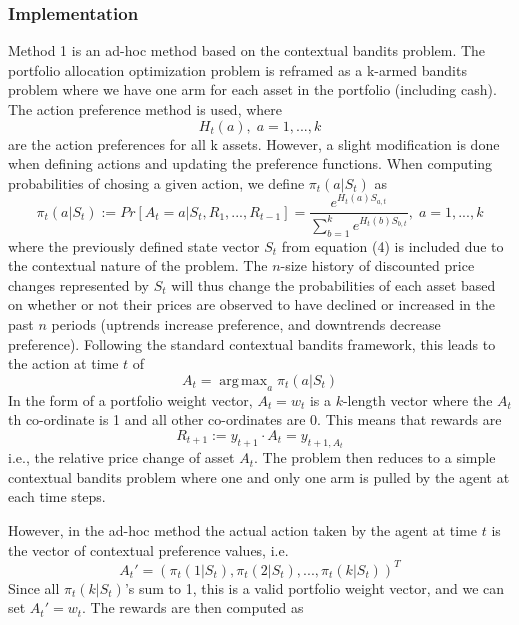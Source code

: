 \documentclass[a4paper,12pt]{article}
\DeclareMathOperator*{\argmax}{arg\,max}
\begin{document}
\subsubsection{Implementation}
Method 1 is an ad-hoc method based on the contextual bandits problem. The portfolio allocation optimization problem is reframed as a k-armed bandits problem where we have one arm for each asset in the portfolio (including cash). The action preference method is used, where 
$$H_t(a), \; a = 1,...,k$$
are the action preferences for all k assets. However, a slight modification is done when defining actions and updating the preference functions. When computing probabilities of chosing a given action, we define $\pi_t(a|S_t)$ as
\begin{equation}
\pi_t (a|S_t) := Pr[A_t=a | S_t,R_1,...,R_{t-1}] = \frac{e^{H_t(a) S_{a,t}}}{\sum_{b=1}^{k} e^{H_t(b) S_{b,t}}}, \; a=1,...,k
\end{equation}
where the previously defined state vector $S_t$ from equation (4) is included due to the contextual nature of the problem. The $n$-size history of discounted price changes represented by $S_t$ will thus change the probabilities of each asset based on whether or not their prices are observed to have declined or increased in the past $n$ periods (uptrends increase preference, and downtrends decrease preference). Following the standard contextual bandits framework, this leads to the action at time $t$ of
\begin{equation}
A_t = \argmax_a \pi_t(a|S_t)
\end{equation}
In the form of a portfolio weight vector, $A_t = w_t$ is a $k$-length vector where the $A_t$th co-ordinate is 1 and all other co-ordinates are 0. This means that rewards are
\begin{equation}
R_{t+1} := y_{t+1} \cdot A_t = y_{t+1,A_t}
\end{equation}
i.e., the relative price change of asset $A_t$. The problem then reduces to a simple contextual bandits problem where one and only one arm is pulled by the agent at each time steps. \par
However, in the ad-hoc method the actual action taken by the agent at time $t$ is the vector of contextual preference values, i.e. 
\begin{equation}
A_t' = (\pi_t(1|S_t),\pi_t(2|S_t),...,\pi_t(k|S_t))^T
\end{equation}
Since all $\pi_t(k|S_t)$'s sum to 1, this is a valid portfolio weight vector, and we can set $A_t' = w_t$. The rewards are then computed as 
\end{document}
